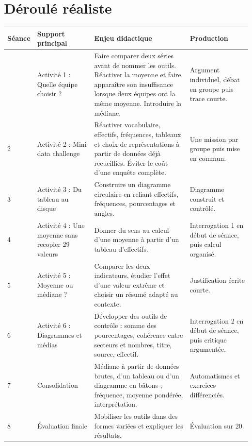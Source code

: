 \documentclass[12pt,a4paper]{article}
\begin{document}
\section*{Déroulé réaliste}

\renewcommand{\arraystretch}{1.38}
\begin{tabularx}{\textwidth}{
|>{\centering\arraybackslash}p{1.05cm}
|>{\raggedright\arraybackslash}p{4.2cm}
|>{\raggedright\arraybackslash}X
|>{\raggedright\arraybackslash}p{3.15cm}|}
\hline
\textbf{Séance} & \textbf{Support principal} &
\textbf{Enjeu didactique} & \textbf{Production}\\
\hline

1 &
Activité 1 : Quelle équipe choisir ? &
Faire comparer deux séries avant de nommer les outils.
Réactiver la moyenne et faire apparaître son insuffisance
lorsque deux équipes ont la même moyenne. Introduire la médiane. &
Argument individuel, débat en groupe puis trace courte.\\
\hline

2 &
Activité 2 : Mini data challenge &
Réactiver vocabulaire, effectifs, fréquences, tableaux et choix
de représentations à partir de données déjà recueillies.
Éviter le coût d'une enquête complète. &
Une mission par groupe puis mise en commun.\\
\hline

3 &
Activité 3 : Du tableau au disque &
Construire un diagramme circulaire en reliant effectifs,
fréquences, pourcentages et angles. &
Diagramme construit et contrôlé.\\
\hline

4 &
Activité 4 : Une moyenne sans recopier 29 valeurs &
Donner du sens au calcul d'une moyenne à partir d'un tableau
d'effectifs. &
Interrogation 1 en début de séance, puis calcul organisé.\\
\hline

5 &
Activité 5 : Moyenne ou médiane ? &
Comparer les deux indicateurs, étudier l'effet d'une valeur extrême
et choisir un résumé adapté au contexte. &
Justification écrite courte.\\
\hline

6 &
Activité 6 : Diagrammes et médias &
Développer des outils de contrôle : somme des pourcentages,
cohérence entre secteurs et nombres, titre, source, effectif. &
Interrogation 2 en début de séance, puis critique argumentée.\\
\hline

7 &
Consolidation &
Médiane à partir de données brutes, d'un tableau ou d'un diagramme
en bâtons ; fréquence, moyenne pondérée, interprétation. &
Automatismes et exercices différenciés.\\
\hline

8 &
Évaluation finale &
Mobiliser les outils dans des formes variées et expliquer les résultats. &
Évaluation sur 20.\\
\hline
\end{tabularx}
\end{document}
